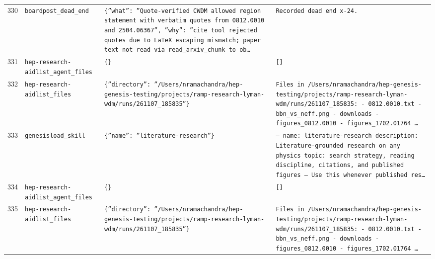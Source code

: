 \documentclass[11pt,a4paper]{article}
\begin{document}
\begin{longtable}{@{}p{}p{}p{}p{}@{}}
330 & \texttt{board}\newline\texttt{post\_\allowbreak{}dead\_\allowbreak{}end} & \texttt{\{''what'':\allowbreak{} ''Quote-verified CWDM allowed region statement with verbatim quotes from 0812.0010 and 2504.06367'',\allowbreak{} ''why'':\allowbreak{} ''cite tool rejected quotes due to LaTeX escaping mismatch;\allowbreak{} paper text not read via read\_\allowbreak{}arxiv\_\allowbreak{}chunk to ob\ldots{}\allowbreak{}} & \texttt{Recorded dead end x-24.} \\
331 & \texttt{hep-research-aid}\newline\texttt{list\_\allowbreak{}agent\_\allowbreak{}files} & \texttt{\{\}\allowbreak{}} & \texttt{[]\allowbreak{}} \\
332 & \texttt{hep-research-aid}\newline\texttt{list\_\allowbreak{}files} & \texttt{\{''directory'':\allowbreak{} ''/\allowbreak{}Users/\allowbreak{}nramachandra/\allowbreak{}hep-genesis-testing/\allowbreak{}projects/\allowbreak{}ramp-research-lyman-wdm/\allowbreak{}runs/\allowbreak{}261107\_\allowbreak{}185835''\}\allowbreak{}} & \texttt{Files in /\allowbreak{}Users/\allowbreak{}nramachandra/\allowbreak{}hep-genesis-testing/\allowbreak{}projects/\allowbreak{}ramp-research-lyman-wdm/\allowbreak{}runs/\allowbreak{}261107\_\allowbreak{}185835:\allowbreak{}   - 0812.0010.txt   - bbn\_\allowbreak{}vs\_\allowbreak{}neff.png   - downloads   - figures\_\allowbreak{}0812.0010   - figures\_\allowbreak{}1702.01764  \ldots{}\allowbreak{}} \\
333 & \texttt{genesis}\newline\texttt{load\_\allowbreak{}skill} & \texttt{\{''name'':\allowbreak{} ''literature-research''\}\allowbreak{}} & \texttt{--- name:\allowbreak{} literature-research description:\allowbreak{} Literature-grounded research on any physics topic:\allowbreak{} search strategy,\allowbreak{} reading discipline,\allowbreak{} citations,\allowbreak{} and published figures ---  Use this whenever published res\ldots{}\allowbreak{}} \\
334 & \texttt{hep-research-aid}\newline\texttt{list\_\allowbreak{}agent\_\allowbreak{}files} & \texttt{\{\}\allowbreak{}} & \texttt{[]\allowbreak{}} \\
335 & \texttt{hep-research-aid}\newline\texttt{list\_\allowbreak{}files} & \texttt{\{''directory'':\allowbreak{} ''/\allowbreak{}Users/\allowbreak{}nramachandra/\allowbreak{}hep-genesis-testing/\allowbreak{}projects/\allowbreak{}ramp-research-lyman-wdm/\allowbreak{}runs/\allowbreak{}261107\_\allowbreak{}185835''\}\allowbreak{}} & \texttt{Files in /\allowbreak{}Users/\allowbreak{}nramachandra/\allowbreak{}hep-genesis-testing/\allowbreak{}projects/\allowbreak{}ramp-research-lyman-wdm/\allowbreak{}runs/\allowbreak{}261107\_\allowbreak{}185835:\allowbreak{}   - 0812.0010.txt   - bbn\_\allowbreak{}vs\_\allowbreak{}neff.png   - downloads   - figures\_\allowbreak{}0812.0010   - figures\_\allowbreak{}1702.01764  \ldots{}\allowbreak{}} \\

\end{longtable}
\end{document}
